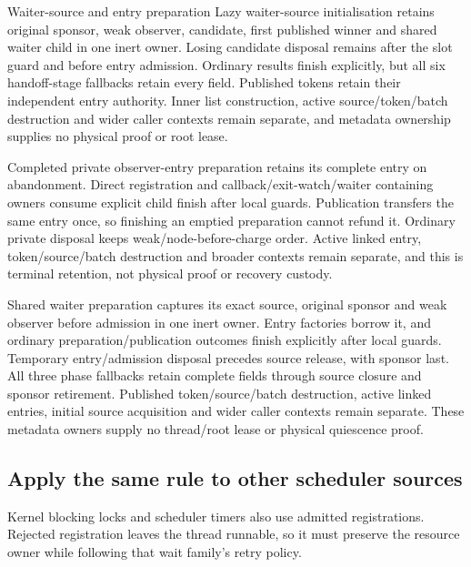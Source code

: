 \begin{implementationdetail}{Waiter-source and entry preparation}
Lazy waiter-source initialisation retains original sponsor, weak observer,
candidate, first published winner and shared waiter child in one inert owner.
Losing candidate disposal remains after the slot guard and before entry admission.
Ordinary results finish explicitly, but all six handoff-stage fallbacks retain every
field. Published tokens retain their independent entry authority. Inner list
construction, active source/token/batch destruction and wider caller contexts
remain separate, and metadata ownership supplies no physical proof or root lease.

Completed private observer-entry preparation retains its complete entry on
abandonment. Direct registration and callback/exit-watch/waiter containing
owners consume explicit child finish after local guards. Publication transfers
the same entry once, so finishing an emptied preparation cannot refund it.
Ordinary private disposal keeps weak/node-before-charge order. Active linked
entry, token/source/batch destruction and broader contexts remain separate, and
this is terminal retention, not physical proof or recovery custody.

Shared waiter preparation captures its exact source, original sponsor and weak
observer before admission in one inert owner. Entry factories borrow it, and
ordinary preparation/publication outcomes finish explicitly after local guards.
Temporary entry/admission disposal precedes source release, with sponsor last.
All three phase fallbacks retain complete fields through source closure and
sponsor retirement. Published token/source/batch destruction, active linked
entries, initial source acquisition and wider caller contexts remain separate.
These metadata owners supply no thread/root lease or physical quiescence proof.
\end{implementationdetail}

\subsection{Apply the same rule to other scheduler sources}

Kernel blocking locks and scheduler timers also use admitted registrations.
Rejected registration leaves the thread runnable, so it must preserve the resource
owner while following that wait family's retry policy.

